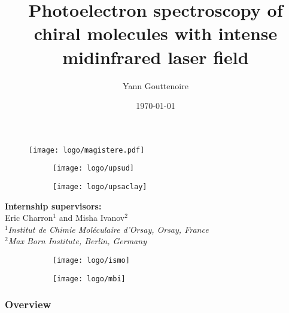 \documentclass{beamer}
\title[]{Photoelectron spectroscopy of chiral molecules with intense midinfrared laser field} %
\author{Yann Gouttenoire} %
\institute[UPSUD] %
{
University Paris-Sud \\ %
\medskip
\textit{yann.gouttenoire@u-psud.fr} %
}
\date{\today} %
\begin{document}
\begin{frame}
\titlepage %
 \begin{figure}[h]
      \centering
      \vspace{-0.5cm}
    \texttt{[image: logo/magistere.pdf]}
      \end{figure}    
      \vspace{-1cm}  
   \begin{figure}[h]
   \centering
   \begin{subfigure}[l]{0.30\textwidth}
       \texttt{[image: logo/upsud]}
   \end{subfigure}
   \hfill
   \begin{subfigure}[r]{0.30\textwidth}
       \texttt{[image: logo/upsaclay]}
   \end{subfigure}
   \end{figure}
        \vfill
\end{frame}

\begin{frame}

 {\large \textbf{Internship supervisors:}}\\
       \vspace{0.5cm} 
  {\large Eric Charron$^{1}$ and Misha Ivanov$^{2}$} \\
       \vspace{0.5cm}
  {\large \textit{$^{1}$Institut de Chimie Mol\'eculaire d'Orsay, Orsay, France}} \\   
  {\large \textit{$^{2}$Max Born Institute, Berlin, Germany}} \\
   \begin{figure}[h]
   \centering
   \begin{subfigure}[l]{0.2\textwidth}
       \texttt{[image: logo/ismo]}
   \end{subfigure}
   \hfill
   \begin{subfigure}[r]{0.2\textwidth}
       \texttt{[image: logo/mbi]}
   \end{subfigure}
   \end{figure}
\end{frame}


\begin{frame}
\frametitle{Overview} %
\tableofcontents %
\end{frame}
\end{document}
